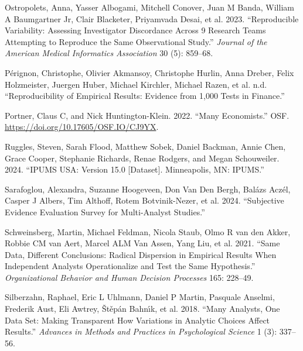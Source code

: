 \documentclass[
  letterpaper,
  DIV=11,
  numbers=noendperiod]{scrartcl}
\newlength{\cslhangindent}
\newlength{\cslentryspacingunit} %
\newenvironment{CSLReferences}[2] %
 {%
  \setlength{\parindent}{0pt}
  \ifodd #1
  \let\oldpar\par
  \def\par{\hangindent=\cslhangindent\oldpar}
  \fi
  \setlength{\parskip}{#2\cslentryspacingunit}
 }%
 {}
\begin{document}
\begin{CSLReferences}{1}{0}
\leavevmode{}%
Ostropolets, Anna, Yasser Albogami, Mitchell Conover, Juan M Banda,
William A Baumgartner Jr, Clair Blacketer, Priyamvada Desai, et al.
2023. {``Reproducible Variability: Assessing Investigator Discordance
Across 9 Research Teams Attempting to Reproduce the Same Observational
Study.''} \emph{Journal of the American Medical Informatics Association}
30 (5): 859--68.

\leavevmode{}%
Pérignon, Christophe, Olivier Akmansoy, Christophe Hurlin, Anna Dreber,
Felix Holzmeister, Juergen Huber, Michael Kirchler, Michael Razen, et
al. n.d. {``Reproducibility of Empirical Results: Evidence from 1,000
Tests in Finance.''}

\leavevmode{}%
Portner, Claus C, and Nick Huntington-Klein. 2022. {``Many
Economists.''} OSF. \url{https://doi.org/10.17605/OSF.IO/CJ9YX}.

\leavevmode{}%
Ruggles, Steven, Sarah Flood, Matthew Sobek, Daniel Backman, Annie Chen,
Grace Cooper, Stephanie Richards, Renae Rodgers, and Megan Schouweiler.
2024. {``IPUMS USA: Version 15.0 {[}Dataset{]}. Minneapolis, MN:
IPUMS.''}

\leavevmode{}%
Sarafoglou, Alexandra, Suzanne Hoogeveen, Don Van Den Bergh, Balázs
Aczél, Casper J Albers, Tim Althoff, Rotem Botvinik-Nezer, et al. 2024.
{``Subjective Evidence Evaluation Survey for Multi-Analyst Studies.''}

\leavevmode{}%
Schweinsberg, Martin, Michael Feldman, Nicola Staub, Olmo R van den
Akker, Robbie CM van Aert, Marcel ALM Van Assen, Yang Liu, et al. 2021.
{``Same Data, Different Conclusions: Radical Dispersion in Empirical
Results When Independent Analysts Operationalize and Test the Same
Hypothesis.''} \emph{Organizational Behavior and Human Decision
Processes} 165: 228--49.

\leavevmode{}%
Silberzahn, Raphael, Eric L Uhlmann, Daniel P Martin, Pasquale Anselmi,
Frederik Aust, Eli Awtrey, Štěpán Bahnı́k, et al. 2018. {``Many Analysts,
One Data Set: Making Transparent How Variations in Analytic Choices
Affect Results.''} \emph{Advances in Methods and Practices in
Psychological Science} 1 (3): 337--56.


\end{CSLReferences}
\end{document}
